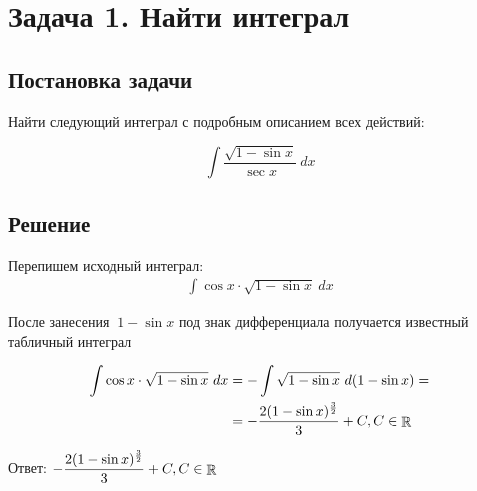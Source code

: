 \section{Задача 1. Найти интеграл}
\subsection{Постановка задачи}
Найти следующий интеграл с подробным описанием всех действий:

\[\int \frac{ \sqrt{1 - \sin{x}} }{ \sec{x} } ~ dx\]

\subsection{Решение}

Перепишем исходный интеграл:
\begin{align*}
	\int \cos{x} \cdot \sqrt{1 - \sin{x}} ~ dx
\end{align*}

После занесения $\ 1 - \sin{x} $ под знак дифференциала получается известный табличный интеграл

\begin{align*}
	\int  \cos{x} \cdot \sqrt{1 - \sin{x}} ~ dx
	& = -\int \sqrt{1 - \sin{x}} ~ d(1 - \sin{x}) = \\
	& = -\frac{2 (1 - \sin{x})^\frac{3}{2}}{3} + {C},
	C \in \mathop{\rm \mathbb{R}}
\end{align*}

Ответ: $ \displaystyle -\frac{2 (1 - \sin{x})^\frac{3}{2}}{3} + {C}, C \in \mathop{\rm \mathbb{R}} $
